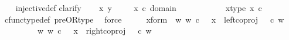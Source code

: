 \begin{isabellebody}
%
\isadelimproof
\ \ %
\endisadelimproof
%
\isatagproof
{}\isamarkupfalse%
\ injective{\isacharunderscore}{\kern0pt}def\isanewline
{}\isamarkupfalse%
{\isacharparenleft}{\kern0pt}clarify{\isacharparenright}{\kern0pt}\isanewline
\ \ \isamarkupfalse%
\ x\ y\ \isanewline
\ \ \isamarkupfalse%
\ {\isachardoublequoteopen}x\ {\isasymin}\isactrlsub c\ domain\ {\isacharparenleft}{\kern0pt}{\isasymlangle}{\isasymt}{\isacharcomma}{\kern0pt}{\isasymt}{\isasymrangle}\ {\isasymamalg}\ {\isasymlangle}{\isasymt}{\isacharcomma}{\kern0pt}{\isasymf}{\isasymrangle}\ {\isasymamalg}\ {\isasymlangle}{\isasymf}{\isacharcomma}{\kern0pt}{\isasymt}{\isasymrangle}{\isacharparenright}{\kern0pt}{\isachardoublequoteclose}\ \isanewline
\ \ \isamarkupfalse%
\ \isamarkupfalse%
\ x{\isacharunderscore}{\kern0pt}type{\isacharcolon}{\kern0pt}\ {\isachardoublequoteopen}x\ {\isasymin}\isactrlsub c\ {\isacharparenleft}{\kern0pt}{\isasymone}{\isasymCoprod}{\isacharparenleft}{\kern0pt}{\isasymone}{\isasymCoprod}{\isasymone}{\isacharparenright}{\kern0pt}{\isacharparenright}{\kern0pt}{\isachardoublequoteclose}\ \ \isanewline
\ \ \ \ \isamarkupfalse%
\ cfunc{\isacharunderscore}{\kern0pt}type{\isacharunderscore}{\kern0pt}def\ pre{\isacharunderscore}{\kern0pt}OR{\isacharunderscore}{\kern0pt}type\ \isamarkupfalse%
\ force\isanewline
\ \ \isamarkupfalse%
\ \isamarkupfalse%
\ x{\isacharunderscore}{\kern0pt}form{\isacharcolon}{\kern0pt}\ {\isachardoublequoteopen}{\isacharparenleft}{\kern0pt}{\isasymexists}\ w{\isachardot}{\kern0pt}\ {\isacharparenleft}{\kern0pt}w\ {\isasymin}\isactrlsub c\ {\isasymone}\ {\isasymand}\ x\ {\isacharequal}{\kern0pt}\ {\isacharparenleft}{\kern0pt}left{\isacharunderscore}{\kern0pt}coproj\ {\isasymone}\ {\isacharparenleft}{\kern0pt}{\isasymone}{\isasymCoprod}{\isasymone}{\isacharparenright}{\kern0pt}{\isacharparenright}{\kern0pt}\ {\isasymcirc}\isactrlsub c\ w{\isacharparenright}{\kern0pt}{\isacharparenright}{\kern0pt}\isanewline
\ \ \ \ \ \ {\isasymor}\ \ {\isacharparenleft}{\kern0pt}{\isasymexists}\ w{\isachardot}{\kern0pt}\ {\isacharparenleft}{\kern0pt}w\ {\isasymin}\isactrlsub c\ {\isacharparenleft}{\kern0pt}{\isasymone}{\isasymCoprod}{\isasymone}{\isacharparenright}{\kern0pt}\ {\isasymand}\ x\ {\isacharequal}{\kern0pt}\ {\isacharparenleft}{\kern0pt}right{\isacharunderscore}{\kern0pt}coproj\ {\isasymone}\ {\isacharparenleft}{\kern0pt}{\isasymone}{\isasymCoprod}{\isasymone}{\isacharparenright}{\kern0pt}{\isacharparenright}{\kern0pt}\ {\isasymcirc}\isactrlsub c\ w{\isacharparenright}{\kern0pt}{\isacharparenright}{\kern0pt}{\isachardoublequoteclose}\isanewline

\end{isabellebody}

